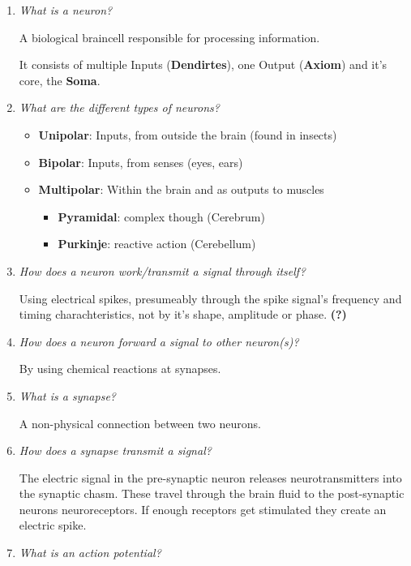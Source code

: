 \documentclass[
    fontsize      = 11pt,
    paper         = a4,
    twoside       = false,
    parskip       = half,
    pagesize      = false,
]{scrartcl}
\providecommand{\tightlist}{%
  \setlength{\itemsep}{0pt}\setlength{\parskip}{0pt}}
\begin{document}
\begin{enumerate}
\def\labelenumi{\arabic{enumi}.}
\item
  \emph{What is a neuron?}

  A biological braincell responsible for processing information.

  It consists of multiple Inputs (\textbf{Dendirtes}), one Output
  (\textbf{Axiom}) and it's core, the \textbf{Soma}.
\item
  \emph{What are the different types of neurons?}

  \begin{itemize}
  \tightlist
  \item
    \textbf{Unipolar}: Inputs, from outside the brain (found in insects)
  \item
    \textbf{Bipolar}: Inputs, from senses (eyes, ears)
  \item
    \textbf{Multipolar}: Within the brain and as outputs to muscles

    \begin{itemize}
    \tightlist
    \item
      \textbf{Pyramidal}: complex though (Cerebrum)
    \item
      \textbf{Purkinje}: reactive action (Cerebellum)
    \end{itemize}
  \end{itemize}
\item
  \emph{How does a neuron work/transmit a signal through itself?}

  Using electrical spikes, presumeably through the spike signal's
  frequency and timing charachteristics, not by it's shape, amplitude or
  phase. \textbf{(?)}
\item
  \emph{How does a neuron forward a signal to other neuron(s)?}

  By using chemical reactions at synapses.
\item
  \emph{What is a synapse?}

  A non-physical connection between two neurons.
\item
  \emph{How does a synapse transmit a signal?}

  The electric signal in the pre-synaptic neuron releases
  neurotransmitters into the synaptic chasm. These travel through the
  brain fluid to the post-synaptic neurons neuroreceptors. If enough
  receptors get stimulated they create an electric spike.
\item
  \emph{What is an action potential?}


\end{enumerate}
\end{document}
